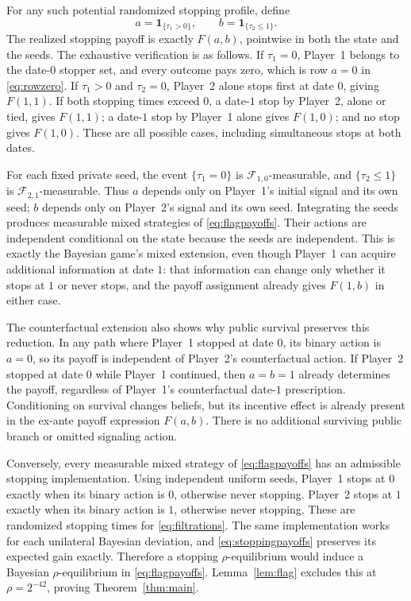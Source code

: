 \documentclass[11pt]{article}
\theoremstyle{remark}
\newcommand{\ind}{\mathbf 1}
\newcommand{\F}{\mathcal F}
\begin{document}
For any such potential randomized stopping profile, define
\begin{equation}\label{eq:actionsfromstops}
 a=\ind_{\{\tau_1>0\}},\qquad b=\ind_{\{\tau_2\le1\}}.
\end{equation}
The realized stopping payoff is exactly $F(a,b)$, pointwise in both the
state and the seeds. The exhaustive verification is as follows.
If $\tau_1=0$, Player~1 belongs to the date-$0$ stopper set, and
every outcome pays zero, which is row $a=0$ in \eqref{eq:rowzero}.
If $\tau_1>0$ and $\tau_2=0$, Player~2 alone stops first at date
$0$, giving $F(1,1)$. If both stopping times exceed $0$, a date-$1$
stop by Player~2, alone or tied, gives $F(1,1)$; a date-$1$ stop by
Player~1 alone gives $F(1,0)$; and no stop gives $F(1,0)$. These
are all possible cases, including simultaneous stops at both dates.

For each fixed private seed, the event $\{\tau_1=0\}$ is
$\F_{1,0}$-measurable, and $\{\tau_2\le1\}$ is
$\F_{2,1}$-measurable. Thus $a$ depends only on Player~1's initial
signal and its own seed; $b$ depends only on Player~2's signal and its
own seed. Integrating the seeds produces measurable mixed strategies
of \eqref{eq:flagpayoffs}. Their actions are independent conditional
on the state because the seeds are independent. This is exactly the
Bayesian game's mixed extension, even though Player~1 can acquire
additional information at date $1$: that information can change only
whether it stops at $1$ or never stops, and the payoff assignment
already gives $F(1,b)$ in either case.

The counterfactual extension also shows why public survival preserves
this reduction. In any path where Player~1 stopped at date $0$, its
binary action is $a=0$, so its payoff is independent of Player~2's
counterfactual action. If Player~2 stopped at date $0$ while Player~1
continued, then $a=b=1$ already determines the payoff, regardless of
Player~1's counterfactual date-$1$ prescription. Conditioning on survival
changes beliefs, but its incentive effect is already present in the
ex-ante payoff expression $F(a,b)$. There is no additional surviving
public branch or omitted signaling action.

Conversely, every measurable mixed strategy of
\eqref{eq:flagpayoffs} has an admissible stopping implementation.
Using independent uniform seeds, Player~1 stops at $0$ exactly when
its binary action is $0$, otherwise never stopping. Player~2 stops at
$1$ exactly when its binary action is $1$, otherwise never stopping.
These are randomized stopping times for \eqref{eq:filtrations}.
The same implementation works for each unilateral Bayesian deviation,
and \eqref{eq:stoppingpayoffs} preserves its expected gain exactly.
Therefore a stopping $\rho$-equilibrium would induce a Bayesian
$\rho$-equilibrium in \eqref{eq:flagpayoffs}. Lemma~\ref{lem:flag}
excludes this at $\rho=2^{-42}$, proving Theorem~\ref{thm:main}.
\end{document}
